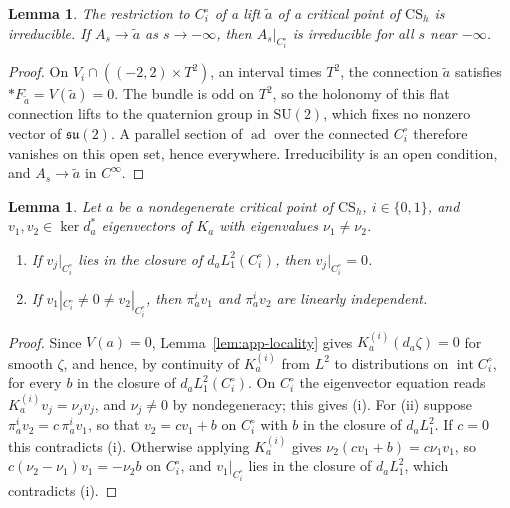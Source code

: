\documentclass[11pt]{amsart}
\newtheorem{lemma}[theorem]{Lemma}
\theoremstyle{definition}
\theoremstyle{remark}
\theoremstyle{plain}
\numberwithin{equation}{section}
\newcommand{\ad}{\operatorname{ad}}
\newcommand{\SU}{\mathrm{SU}}
\begin{document}
\begin{lemma}\label{lem:app-irreducible}
The restriction to $C_i^\circ$ of a lift $\tilde a$ of a critical point of $\mathrm{CS}_h$ is
irreducible. If $A_s\to\tilde a$ as $s\to-\infty$, then $A_s|_{C_i^\circ}$ is irreducible for all
$s$ near $-\infty$.
\end{lemma}

\begin{proof}
On $V_i\cap((-2,2)\times T^2)$, an interval times $T^2$, the connection $\tilde a$ satisfies
$*F_{\tilde a}=V(\tilde a)=0$. The bundle is odd on $T^2$, so the holonomy of this flat
connection lifts to the quaternion group in $\SU(2)$, which fixes no nonzero vector of
$\mathfrak{su}(2)$. A parallel section of $\ad$ over the connected $C_i^\circ$ therefore vanishes
on this open set, hence everywhere. Irreducibility is an open condition, and
$A_s\to\tilde a$ in $C^\infty$.
\end{proof}

\begin{lemma}\label{lem:app-eigen}
Let $a$ be a nondegenerate critical point of $\mathrm{CS}_h$, $i\in\{0,1\}$, and
$v_1,v_2\in\ker d_a^*$ eigenvectors of $K_a$ with eigenvalues $\nu_1\ne\nu_2$.
\begin{enumerate}[label=(\roman*)]
\item If $v_j|_{C_i^\circ}$ lies in the closure of $d_aL^2_1(C_i^\circ)$, then
  $v_j|_{C_i^\circ}=0$.
\item If $v_1|_{C_i^\circ}\ne0\ne v_2|_{C_i^\circ}$, then $\pi^i_av_1$ and $\pi^i_av_2$ are
  linearly independent.
\end{enumerate}
\end{lemma}

\begin{proof}
Since $V(a)=0$, Lemma~\ref{lem:app-locality} gives $K^{(i)}_a(d_a\zeta)=0$ for smooth $\zeta$, and
hence, by continuity of $K^{(i)}_a$ from $L^2$ to distributions on
$\operatorname{int}C_i^\circ$, for every $b$ in the closure of $d_aL^2_1(C_i^\circ)$. On
$C_i^\circ$ the eigenvector equation reads $K^{(i)}_av_j=\nu_jv_j$, and $\nu_j\ne0$ by
nondegeneracy; this gives (i). For (ii) suppose $\pi^i_av_2=c\,\pi^i_av_1$, so that
$v_2=cv_1+b$ on $C_i^\circ$ with $b$ in the closure of $d_aL^2_1$. If $c=0$ this contradicts
(i). Otherwise applying $K^{(i)}_a$ gives $\nu_2(cv_1+b)=c\nu_1v_1$, so
$c(\nu_2-\nu_1)v_1=-\nu_2b$ on $C_i^\circ$, and $v_1|_{C_i^\circ}$ lies in the closure of
$d_aL^2_1$, which contradicts (i).
\end{proof}
\end{document}
